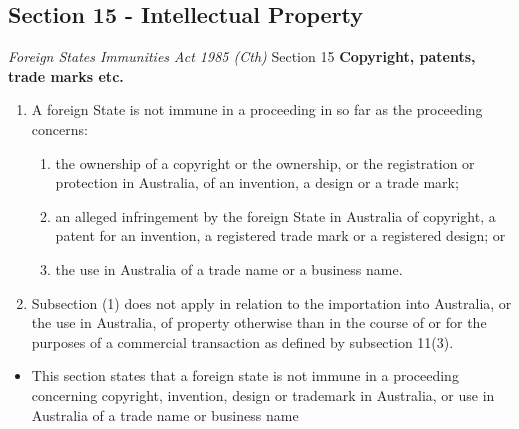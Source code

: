 \subsection{Section 15 - Intellectual Property}
\begin{statutedetails}{\textit{Foreign States Immunities Act 1985 (Cth)} Section 15}
    \flushleft
    \textbf{Copyright, patents, trade marks etc.}

    \begin{enumerate}[label=(\arabic*)]
        \item A foreign State is not immune in a proceeding in so far as the proceeding concerns:
        \begin{enumerate}[label=(\alph*)]
            \item the ownership of a copyright or the ownership, or the registration or protection in Australia, of an invention, a design or a trade mark;
            \item an alleged infringement by the foreign State in Australia of copyright, a patent for an invention, a registered trade mark or a registered design; or
            \item the use in Australia of a trade name or a business name.
        \end{enumerate}
        \item Subsection (1) does not apply in relation to the importation into Australia, or the use in Australia, of property otherwise than in the course of or for the purposes of a commercial transaction as defined by subsection 11(3).
    \end{enumerate}
\end{statutedetails}

\begin{itemize}
    \item This section states that a foreign state is not immune in a proceeding concerning copyright, invention, design or trademark in Australia, or use in Australia of a trade name or business name
\end{itemize}

